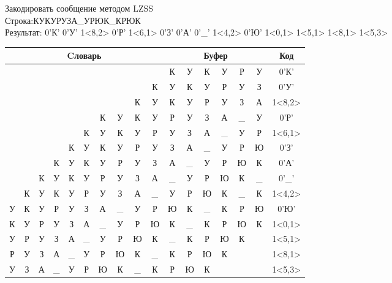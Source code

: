 \documentclass[a4paper, 12pt]{article}
\begin{document}
Закодировать сообщение методом LZSS\\
Строка:КУКУРУЗА\_УРЮК\_КРЮК\\
Результат: 0'К' 0'У' 1<8,2> 0'Р' 1<6,1> 0'З' 0'А' 0'\_' 1<4,2> 0'Ю' 1<0,1> 1<5,1> 1<8,1> 1<5,3>\\
\begin{table}[h!]
\centering
\begin{tabular}{|c|c|c|c|c|c|c|c|c|c|c|c|c|c|c|c|c|}
\hline
\multicolumn{10}{|c|}{Cловарь} & \multicolumn{6}{c|}{Буфер} & Код  \\ \hline
  &   &   &   &   &   &   &   &   &   & К & У & К & У & Р & У & 0'К'\\ \hline
  &   &   &   &   &   &   &   &   & К & У & К & У & Р & У & З & 0'У'\\ \hline
  &   &   &   &   &   &   &   & \cellcolor[HTML]{FFFF00} К & \cellcolor[HTML]{FFFF00} У & \cellcolor[HTML]{FFFF00} К & \cellcolor[HTML]{FFFF00} У & Р & У & З & А & 1<8,2>\\ \hline
  &   &   &   &   &   & К & У & К & У & Р & У & З & А & \_ & У & 0'Р'\\ \hline
  &   &   &   &   & К & \cellcolor[HTML]{FFFF00} У & К & У & Р & \cellcolor[HTML]{FFFF00} У & З & А & \_ & У & Р & 1<6,1>\\ \hline
  &   &   &   & К & У & К & У & Р & У & З & А & \_ & У & Р & Ю & 0'З'\\ \hline
  &   &   & К & У & К & У & Р & У & З & А & \_ & У & Р & Ю & К & 0'А'\\ \hline
  &   & К & У & К & У & Р & У & З & А & \_ & У & Р & Ю & К & \_ & 0'\_'\\ \hline
  & К & У & К & \cellcolor[HTML]{FFFF00} У & \cellcolor[HTML]{FFFF00} Р & У & З & А & \_ & \cellcolor[HTML]{FFFF00} У & \cellcolor[HTML]{FFFF00} Р & Ю & К & \_ & К & 1<4,2>\\ \hline
У & К & У & Р & У & З & А & \_ & У & Р & Ю & К & \_ & К & Р & Ю & 0'Ю'\\ \hline
\cellcolor[HTML]{FFFF00} К & У & Р & У & З & А & \_ & У & Р & Ю & \cellcolor[HTML]{FFFF00} К & \_ & К & Р & Ю & К & 1<0,1>\\ \hline
У & Р & У & З & А & \cellcolor[HTML]{FFFF00} \_ & У & Р & Ю & К & \cellcolor[HTML]{FFFF00} \_ & К & Р & Ю & К &   & 1<5,1>\\ \hline
Р & У & З & А & \_ & У & Р & Ю & \cellcolor[HTML]{FFFF00} К & \_ & \cellcolor[HTML]{FFFF00} К & Р & Ю & К &   &   & 1<8,1>\\ \hline
У & З & А & \_ & У & \cellcolor[HTML]{FFFF00} Р & \cellcolor[HTML]{FFFF00} Ю & \cellcolor[HTML]{FFFF00} К & \_ & К & \cellcolor[HTML]{FFFF00} Р & \cellcolor[HTML]{FFFF00} Ю & \cellcolor[HTML]{FFFF00} К &   &   &   & 1<5,3>\\ \hline
\end{tabular}
\end{table}
\end{document}

